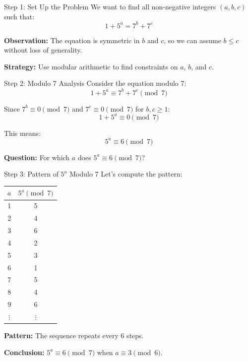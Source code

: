 ﻿\documentclass[10pt,aspectratio=169]{beamer}
\begin{document}
\begin{frame}{Step 1: Set Up the Problem}
    We want to find all non-negative integers $(a,b,c)$ such that:
    \[1 + 5^a = 7^b + 7^c\]
    
    \vspace{0.3cm}
    \textbf{Observation:} The equation is symmetric in $b$ and $c$, so we can assume $b \leq c$ without loss of generality.
    
    \textbf{Strategy:} Use modular arithmetic to find constraints on $a$, $b$, and $c$.
\end{frame}

\begin{frame}{Step 2: Modulo 7 Analysis}
    Consider the equation modulo 7:
    \[1 + 5^a \equiv 7^b + 7^c \pmod 7\]
    
    Since $7^b \equiv 0 \pmod 7$ and $7^c \equiv 0 \pmod 7$ for $b,c \geq 1$:
    \[1 + 5^a \equiv 0 \pmod 7\]
    
    This means:
    \[5^a \equiv 6 \pmod 7\]
    
    \textbf{Question:} For which $a$ does $5^a \equiv 6 \pmod 7$?
\end{frame}

\begin{frame}{Step 3: Pattern of $5^a$ Modulo 7}
    Let's compute the pattern:
    
    \begin{tabular}{c|c}
        $a$ & $5^a \pmod 7$ \\ \hline
        1 & 5 \\
        2 & 4 \\
        3 & 6 \\
        4 & 2 \\
        5 & 3 \\
        6 & 1 \\
        7 & 5 \\
        8 & 4 \\
        9 & 6 \\
        $\vdots$ & $\vdots$
    \end{tabular}
    
    \vspace{0.2cm}
    \textbf{Pattern:} The sequence repeats every 6 steps.
    
    \textbf{Conclusion:} $5^a \equiv 6 \pmod 7$ when $a \equiv 3 \pmod 6$.
\end{frame}
\end{document}

